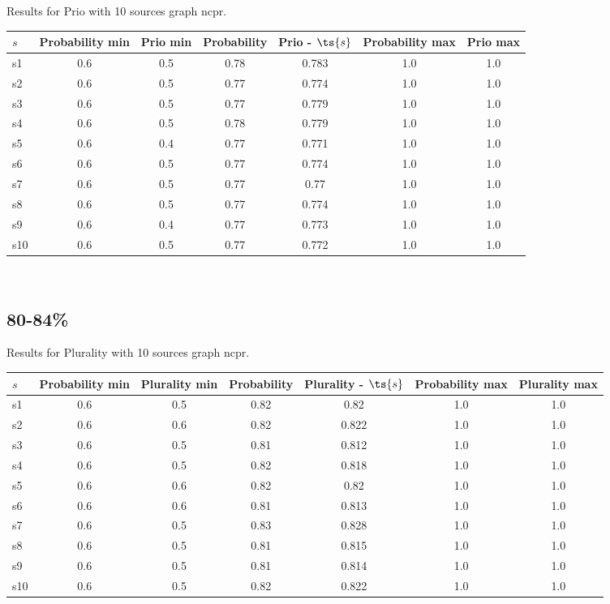 \documentclass{article}
\begin{document}
\noindent Results for Prio with 10 sources graph ncpr.

\noindent\begin{tabular}{|l|c|c|c|c|c|c|}
\hline
$s$& Probability min & Prio min & Probability & Prio - $\ts{s}$ & Probability max & Prio max\\
\hline
s1 &0.6 & 0.5 & 0.78 & 0.783 & 1.0 & 1.0\\
\hline
s2 &0.6 & 0.5 & 0.77 & 0.774 & 1.0 & 1.0\\
\hline
s3 &0.6 & 0.5 & 0.77 & 0.779 & 1.0 & 1.0\\
\hline
s4 &0.6 & 0.5 & 0.78 & 0.779 & 1.0 & 1.0\\
\hline
s5 &0.6 & 0.4 & 0.77 & 0.771 & 1.0 & 1.0\\
\hline
s6 &0.6 & 0.5 & 0.77 & 0.774 & 1.0 & 1.0\\
\hline
s7 &0.6 & 0.5 & 0.77 & 0.77 & 1.0 & 1.0\\
\hline
s8 &0.6 & 0.5 & 0.77 & 0.774 & 1.0 & 1.0\\
\hline
s9 &0.6 & 0.4 & 0.77 & 0.773 & 1.0 & 1.0\\
\hline
s10 &0.6 & 0.5 & 0.77 & 0.772 & 1.0 & 1.0\\
\hline
\end{tabular}\\

\newpage

\subsection{80-84\%}

\noindent Results for Plurality with 10 sources graph ncpr.

\noindent\begin{tabular}{|l|c|c|c|c|c|c|}
\hline
$s$& Probability min & Plurality min & Probability & Plurality - $\ts{s}$ & Probability max & Plurality max\\
\hline
s1 &0.6 & 0.5 & 0.82 & 0.82 & 1.0 & 1.0\\
\hline
s2 &0.6 & 0.6 & 0.82 & 0.822 & 1.0 & 1.0\\
\hline
s3 &0.6 & 0.5 & 0.81 & 0.812 & 1.0 & 1.0\\
\hline
s4 &0.6 & 0.5 & 0.82 & 0.818 & 1.0 & 1.0\\
\hline
s5 &0.6 & 0.6 & 0.82 & 0.82 & 1.0 & 1.0\\
\hline
s6 &0.6 & 0.6 & 0.81 & 0.813 & 1.0 & 1.0\\
\hline
s7 &0.6 & 0.5 & 0.83 & 0.828 & 1.0 & 1.0\\
\hline
s8 &0.6 & 0.5 & 0.81 & 0.815 & 1.0 & 1.0\\
\hline
s9 &0.6 & 0.5 & 0.81 & 0.814 & 1.0 & 1.0\\
\hline
s10 &0.6 & 0.5 & 0.82 & 0.822 & 1.0 & 1.0\\
\hline
\end{tabular}\\
\end{document}
